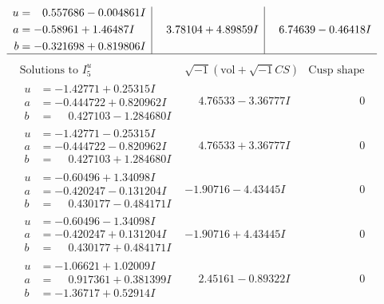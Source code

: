\documentclass[1p]{elsarticle_modified}
\theoremstyle{definition}
\newcommand{\I}{\sqrt{-1}}
\begin{document}
$$\begin{array}{c|c|c}
\begin{aligned}
u &= \phantom{-}0.557686 - 0.004861 I \\
a &= -0.58961 + 1.46487 I \\
b &= -0.321698 + 0.819806 I\end{aligned}
 & \phantom{-}3.78104 + 4.89859 I & \phantom{-}6.74639 - 0.46418 I\\
 \hline 
 \end{array}$$\newpage$$\begin{array}{c|c|c}  
\text{Solutions to }I^u_{5}& \I (\text{vol} + \sqrt{-1}CS) & \text{Cusp shape}\\
 \hline 
\begin{aligned}
u &= -1.42771 + 0.25315 I \\
a &= -0.444722 + 0.820962 I \\
b &= \phantom{-}0.427103 - 1.284680 I\end{aligned}
 & \phantom{-}4.76533 - 3.36777 I & \phantom{-0.000000 } 0 \\ \hline\begin{aligned}
u &= -1.42771 - 0.25315 I \\
a &= -0.444722 - 0.820962 I \\
b &= \phantom{-}0.427103 + 1.284680 I\end{aligned}
 & \phantom{-}4.76533 + 3.36777 I & \phantom{-0.000000 } 0 \\ \hline\begin{aligned}
u &= -0.60496 + 1.34098 I \\
a &= -0.420247 - 0.131204 I \\
b &= \phantom{-}0.430177 - 0.484171 I\end{aligned}
 & -1.90716 - 4.43445 I & \phantom{-0.000000 } 0 \\ \hline\begin{aligned}
u &= -0.60496 - 1.34098 I \\
a &= -0.420247 + 0.131204 I \\
b &= \phantom{-}0.430177 + 0.484171 I\end{aligned}
 & -1.90716 + 4.43445 I & \phantom{-0.000000 } 0 \\ \hline\begin{aligned}
u &= -1.06621 + 1.02009 I \\
a &= \phantom{-}0.917361 + 0.381399 I \\
b &= -1.36717 + 0.52914 I\end{aligned}
 & \phantom{-}2.45161 - 0.89322 I & \phantom{-0.000000 } 0 \\ \hline\begin{aligned}

\end{aligned}
\end{array}$$
\end{document}

